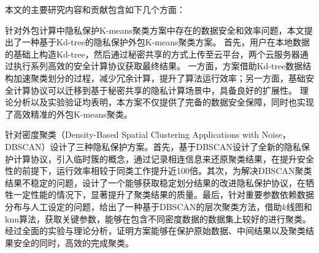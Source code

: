 \begin{cabstract}
本文的主要研究内容和贡献包含如下几个方面：
\begin{compactenum}
\item 针对外包计算中隐私保护K-means聚类方案中存在的数据安全和效率问题，本文提出了一种基于Kd-tree的隐私保护外包K-means聚类方案。
首先，用户在本地数据的基础上构造Kd-tree，然后通过秘密共享的方式上传至云平台，两个云服务器通过执行系列高效的安全计算协议获取最终结果。
一方面，方案借助Kd-tree数据结构加速聚类划分的过程，减少冗余计算，提升了算法运行效率；另一方面，基础安全计算协议可以迁移到基于秘密共享的隐私计算场景中，具备良好的扩展性。
理论分析以及实验验证均表明，本方案不仅提供了完备的数据安全保障，同时也实现了高效精准的外包K-means聚类。

\item 针对密度聚类（Density-Based Spatial Clustering Applications with Noise，DBSCAN）设计了三种隐私保护方案。首先，基于DBSCAN设计了全新的隐私保护计算协议，引入临时簇的概念，通过记录相连信息来还原聚类结果，在提升安全性的前提下，运行效率相较于同类工作提升近100倍。其次，为解决DBSCAN聚类结果不稳定的问题，设计了一个能够获取稳定划分结果的改进隐私保护协议，在牺牲一定性能的情况下，显著提升了聚类结果的质量。最后，针对重要参数依赖数据分布与人工设定的问题，给出了一种基于DBSCAN的层次聚类方法，借助$ k $线图和knn算法，获取关键参数，能够在包含不同密度数据的数据集上较好的进行聚类。经过全面的实验与理论分析，证明方案能够在保护原始数据、中间结果以及聚类结果安全的同时，高效的完成聚类。   
\end{compactenum}                                               
\end{cabstract}

